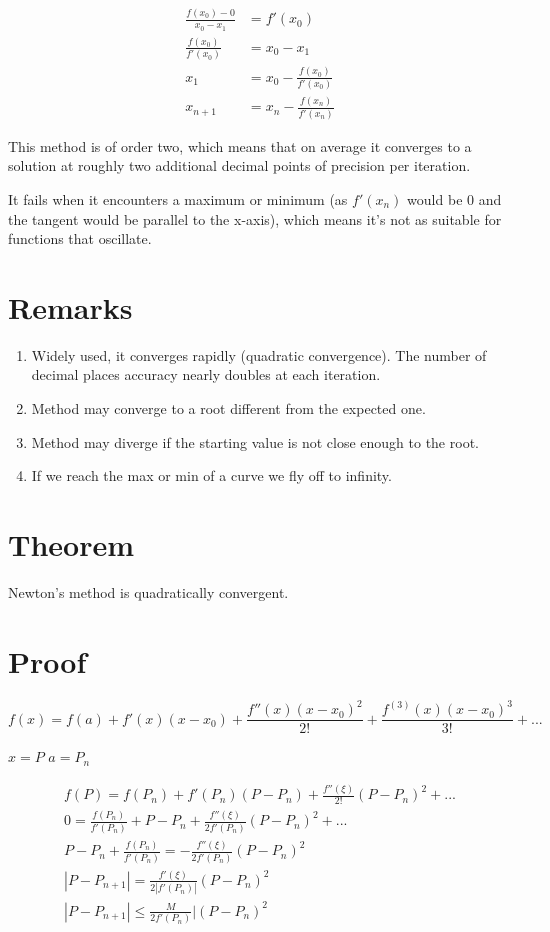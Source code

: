 \documentclass[]{article}
\begin{document}
\begin{align*}
	\frac{f(x_0) - 0}{x_0 - x_1} &= f'(x_0) \\
	\frac{f(x_0)}{f'(x_0)} &= x_0 - x_1 \\
	x_1 &= x_0 - \frac{f(x_0)}{f'(x_0)} \\
	x_{n+1} &= x_n - \frac{f(x_n)}{f'(x_n)}
\end{align*}

This method is of order two, which means that on average it converges to a solution at roughly two additional decimal points of precision per iteration. 

It fails when it encounters a maximum or minimum (as $ f'(x_n) $ would be 0 and the tangent would be parallel to the x-axis), which means it's not as suitable for functions that oscillate. 

\section*{Remarks}

\begin{enumerate}
	\item Widely used, it converges rapidly (quadratic convergence). The number of decimal places accuracy nearly doubles at each iteration.
	\item Method may converge to a root different from the expected one. 
	\item Method may diverge if the starting value is not close enough to the root.
	\item If we reach the max or min of a curve we fly off to infinity. 
\end{enumerate}

	\section*{Theorem}
	
	Newton's method is quadratically convergent. 
	
	\section*{Proof}
	
	\[ f(x) = f(a) + f'(x)(x-x_0) + \frac{f''(x)(x-x_0)^2}{2!} + \frac{f^{(3)}(x)(x-x_0)^3}{3!} + ...  \]
	
	$ x = P $
	$ a = P_n $
	
	\begin{align*}
		f(P) = f(P_n) + f'(P_n)(P-P_n) + \frac{f''(\xi)}{2!}(P-P_n)^2 + ... \\
		0 = \frac{f(P_n)}{f'(P_n)} + P - P_n + \frac{f''(\xi)}{2f'(P_n)}(P-P_n)^2 + ...\\
		P - P_n + \frac{f(P_n)}{f'(P_n)} = - \frac{f''(\xi)}{2f'(P_n)}(P-P_n)^2 \\
		|P-P_{n+1}| = \frac{f'(\xi)}{2|f'(P_n)|}(P - P_n)^2 \\
		|P - P_{n+1}| \le \frac{M}{2f'(P_n)}|(P-P_n)^2
	\end{align*}
\end{document}
